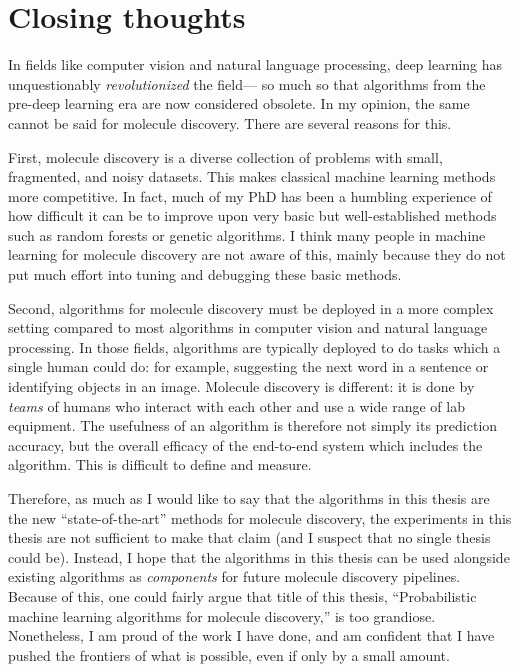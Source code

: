 \section{Closing thoughts}
\label{sec:conclusion:thoughts}

In fields like computer vision and natural language processing,
deep learning has unquestionably \emph{revolutionized} the field---
so much so that algorithms from the pre-deep learning era are now considered obsolete.
In my opinion, the same cannot be said for molecule discovery.
There are several reasons for this.

First, molecule discovery is a diverse collection of problems
with small, fragmented, and noisy datasets.
This makes classical machine learning methods more competitive.
In fact, much of my PhD has been a humbling experience of how difficult it can be to improve upon very
basic but well-established methods such as random forests or genetic algorithms.
I think many people in machine learning for molecule discovery are not aware of this,
mainly because they do not put much effort into tuning and debugging these basic methods.

Second, algorithms for molecule discovery must be deployed in a more complex setting
compared to most algorithms in computer vision and natural language processing.
In those fields, algorithms are typically deployed
to do tasks which a single human could do: for example,
suggesting the next word in a sentence or identifying objects in an image.
Molecule discovery is different:
it is done by \emph{teams} of humans who interact with each other
and use a wide range of lab equipment.
The usefulness of an algorithm is therefore not simply its prediction accuracy,
but the overall efficacy of the end-to-end system which includes the algorithm.
This is difficult to define and measure.

Therefore, as much as I would like to say that the algorithms in this thesis are the new
``state-of-the-art'' methods for molecule discovery,
the experiments in this thesis are not sufficient to make that claim
(and I suspect that no single thesis could be).
Instead, I hope that the algorithms in this thesis can be used
alongside existing algorithms as \emph{components} for future molecule discovery pipelines.
Because of this, one could fairly argue that title of this thesis,
``Probabilistic machine learning algorithms for molecule discovery,''
is too grandiose.
Nonetheless, I am proud of the work I have done,
and am confident that I have pushed the frontiers of what is possible,
even if only by a small amount.
